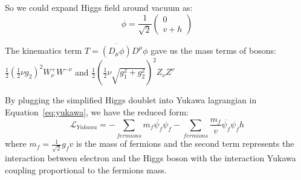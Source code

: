 \par So we could expand Higgs field around vacuum as:
\begin{equation}
  \phi=\frac{1}{\sqrt{2}}\left( \begin{smallmatrix} 0\\v + h \end{smallmatrix}\right)
\end{equation}

\par The kinematics term $T=\overline{\left(D_\mu\phi\right)}D^\mu\phi $ gave us the mass terms of bosons:
 $\frac{1}{2}(\frac{1}{2}\nu g_2)^2 W_\nu^+ W^{-\nu}$ and $\frac{1}{2}(\frac{1}{2}\nu \sqrt{g_1^2+g_2^2})^2 Z_\nu Z^\nu$\\

\par By plugging the simplified Higgs doublet into Yukawa lagrangian in Equation~\ref{eq:yukawa}, we have the reduced form:
\begin{equation}
  \mathcal{L}_{Yukawa} = - \sum_{fermions} m_f \overline{\psi_f}\psi_f - \sum_{fermions} \frac{m_f}{v} \overline{\psi_f}\psi_f h
  \label{eq:vac}
\end{equation}
where $m_f=\frac{1}{\sqrt{2}} g_f v $ is the mass of fermions and the second term represents the interaction between electron and the Higgs boson with the interaction Yukawa coupling proportional to the fermions mass.

